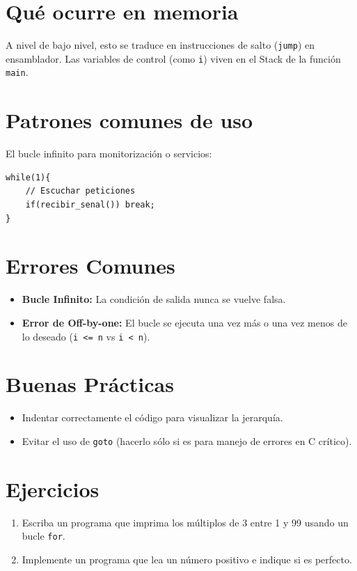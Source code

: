 \documentclass[12pt,a4paper]{article}
\begin{document}
\section{Qué ocurre en memoria}
A nivel de bajo nivel, esto se traduce en instrucciones de salto (\texttt{jump}) en ensamblador. Las variables de control (como \texttt{i}) viven en el Stack de la función \texttt{main}.

\section{Patrones comunes de uso}
El bucle infinito para monitorización o servicios:
\begin{lstlisting}
while(1){
    // Escuchar peticiones
    if(recibir_senal()) break;
}
\end{lstlisting}

\section{Errores Comunes}
\begin{itemize}
    \item \textbf{Bucle Infinito:} La condición de salida nunca se vuelve falsa.
    \item \textbf{Error de Off-by-one:} El bucle se ejecuta una vez más o una vez menos de lo deseado (\texttt{i <= n} vs \texttt{i < n}).
\end{itemize}

\section{Buenas Prácticas}
\begin{itemize}
    \item Indentar correctamente el código para visualizar la jerarquía.
    \item Evitar el uso de \texttt{goto} (hacerlo sólo si es para manejo de errores en C crítico).
\end{itemize}

\section{Ejercicios}
\begin{enumerate}
    \item Escriba un programa que imprima los múltiplos de 3 entre 1 y 99 usando un bucle \texttt{for}.
    \item Implemente un programa que lea un número positivo e indique si es perfecto.
\end{enumerate}
\end{document}
